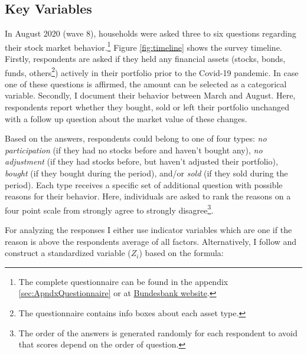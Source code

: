 \documentclass[ProjectABM]{subfiles}
\begin{document}
\subsection{Key Variables}
In August 2020 (wave 8), households were asked three to six questions regarding their stock market behavior.\footnote{The complete questionnaire can be found in the appendix \ref{sec:ApndxQuestionnaire} or at \href{https://www.bundesbank.de/en/bundesbank/research/survey-on-consumer-expectations/questionnaires-850746}{Bundesbank website}.} Figure \ref{fig:timeline} shows the survey timeline. Firstly, respondents are asked if they held any financial assets (stocks, bonds, funds, others\footnote{The questionnaire contains info boxes about each asset type.}) actively in their portfolio prior to the Covid-19 pandemic. In case one of these questions is affirmed, the amount can be selected as a categorical variable. Secondly, I document their behavior between March and August. Here, respondents report whether they bought, sold or left their portfolio unchanged with a follow up question about the market value of these changes. %

Based on the answers, respondents could belong to one of four types: \textit{no participation} (if they had no stocks before and haven't bought any), \textit{no adjustment} (if they had stocks before, but haven't adjusted their portfolio), \textit{bought} (if they bought during the period), and/or \textit{sold} (if they sold during the period). Each type receives a specific set of additional question with possible reasons for their behavior. Here, individuals are asked to rank the reasons on a four point scale from strongly agree to strongly disagree\footnote{The order of the answers is generated randomly for each respondent to avoid that scores depend on the order of question.}.


For analyzing the responses I either use indicator variables which are one if the reason is above the respondents average of all factors. Alternatively, I follow \cite{choi_2020} and construct a standardized variable ($Z_i$) based on the formula:
\end{document}

